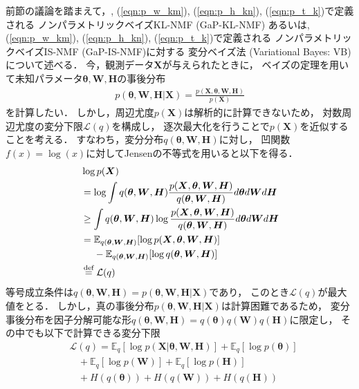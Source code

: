 前節の議論を踏まえて，, (\ref{eqn:p_w_km}),
(\ref{eqn:p_h_kn}), (\ref{eqn:p_t_k})で定義される
ノンパラメトリックベイズKL-NMF (GaP-KL-NMF)
あるいは, (\ref{eqn:p_w_km}),
        (\ref{eqn:p_h_kn}), (\ref{eqn:p_t_k})で定義される
ノンパラメトリックベイズIS-NMF (GaP-IS-NMF)に対する
変分ベイズ法 (Variational Bayes: VB) について述べる．
今，観測データ$\bm{X}$が与えられたときに，
ベイズの定理を用いて未知パラメータ$\bm\theta,\bm{W},\bm{H}$の事後分布
\begin{eqnarray}
 p(\bm\theta,\bm{W},\bm{H} | \bm{X}) 
 = \frac{p(\bm{X}, \bm\theta,\bm{W},\bm{H})}{p(\bm{X})}
\end{eqnarray}
を計算したい．
しかし，周辺尤度$p(\bm{X})$は解析的に計算できないため，
対数周辺尤度の変分下限$\mathcal{L}(q)$を構成し，
逐次最大化を行うことで$p(\bm{X})$を近似することを考える．
すなわち，変分分布$q(\bm\theta,\bm{W},\bm{H})$に対し，
凹関数$f(x)=\log(x)$に対してJensenの不等式を用いると以下を得る．
\begin{align}
&
 \log p(\bm{X})
 \nonumber\\
&
 = \log \int q(\bm\theta,\bm{W},\bm{H}) 
 \frac{p(\bm{X},\bm\theta,\bm{W},\bm{H})}{q(\bm\theta,\bm{W},\bm{H})} d\bm\theta d\bm{W} d\bm{H}
 \nonumber\\
&
 \ge \int q(\bm\theta,\bm{W},\bm{H}) 
 \log \frac{p(\bm{X},\bm\theta,\bm{W},\bm{H})}{q(\bm\theta,\bm{W},\bm{H})} d\bm\theta d\bm{W} d\bm{H}
 \nonumber\\
&
 = \mathbb{E}_{q(\bm\theta,\bm{W},\bm{H})}[\log p(\bm{X},\bm\theta,\bm{W},\bm{H})]
 \nonumber\\
& \ \ \ \
 - \mathbb{E}_{q(\bm\theta,\bm{W},\bm{H})}[\log q(\bm\theta,\bm{W},\bm{H})]
 \nonumber\\
&
 \overset{\mbox{\scriptsize def}}{=} \mathcal{L}(q)
\end{align}
等号成立条件は$q(\bm\theta,\bm{W},\bm{H}) = p(\bm\theta,\bm{W},\bm{H}|\bm{X})$であり，
このとき$\mathcal{L}(q)$が最大値をとる．
しかし，真の事後分布$p(\bm\theta,\bm{W},\bm{H} | \bm{X})$は計算困難であるため，
変分事後分布を因子分解可能な形$q(\bm\theta,\bm{W},\bm{H}) = q(\bm\theta) q(\bm{W}) q(\bm{H})$に限定し，
その中でも以下で計算できる変分下限
\begin{align}
&
 \mathcal{L}(q) = \mathbb{E}_{q}[\log p(\bm{X}|\bm\theta,\bm{W},\bm{H})]
 + \mathbb{E}_{q}[\log p(\bm\theta)]
 \nonumber\\
& \ \ \ \
 + \mathbb{E}_{q}[\log p(\bm{W})]
 + \mathbb{E}_{q}[\log p(\bm{H})]
 \nonumber\\
& \ \ \ \
 + H(q(\bm\theta)) + H(q(\bm{W})) + H(q(\bm{H}))
 \label{eqn:lb}
\end{align}

